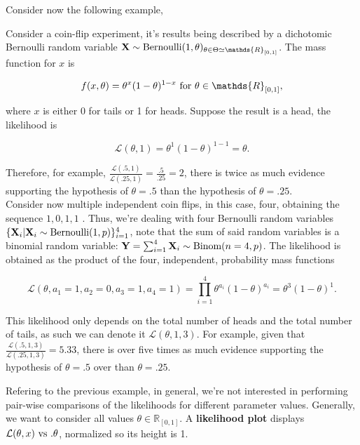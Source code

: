 \documentclass{homework}
\begin{document}
Consider now the following example, 

\begin{tcolorbox}[title = Likelihoods example]

Consider a coin-flip experiment, it's results being described by a dichotomic Bernoulli random variable ${\bf X} \sim \textnormal{Bernoulli}(1,\theta)_{\theta \in \Theta \simeq \mathds{R}_{[0,1]}}$. The mass function for $x$ is 

$$
f(x, \theta) = \theta^x (1- \theta)^{1-x} \textnormal{ for } \theta \in \mathds{R}_{[0,1]},
$$

where $x$ is either 0 for tails or 1 for heads. Suppose the result is a head, the likelihood is 

$$
\mathcal{L}(\theta,1) = \theta^1 (1-\theta)^{1-1} = \theta. 
$$

Therefore, for example, $\frac{\mathcal{L}{(.5,1)}}{\mathcal{L}{(.25,1)}} = \frac{.5}{.25}=2$, there is twice as much evidence supporting the hypothesis of $\theta = .5$ than the hypothesis of $\theta = .25$. \\

Consider now multiple independent coin flips, in this case, four, obtaining the sequence $1, 0, 1, 1$ . Thus, we're dealing with four Bernoulli random variables $\{{\bf X}_i | {\bf X}_i \sim \textnormal{Bernoulli}(1,p)\}_{i=1}^{4} $, note that the sum of said random variables is a binomial random variable: ${\bf Y} = \sum_{i=1}^{4} {\bf X}_i \sim \textnormal{Binom}(n=4,p)$. The likelihood is obtained as the product of the four, independent, probability mass functions

$$
\mathcal{L}(\theta, a_1=1, a_2=0, a_3=1, a_4=1) = \prod_{i=1}^{4} \theta^{a_i}(1-\theta)^{a_i} = \theta^3 (1-\theta)^1.
$$

This likelihood only depends on the total number of heads and the total number of tails, as such we can denote it $\mathcal{L}(\theta, 1,3)$. For example, given that $\frac{\mathcal{L}{(.5,1,3)}}{\mathcal{L}{(.25,1,3)}} = 5.33$, there is over five times as much evidence supporting the hypothesis of $\theta=.5$ over than $\theta =.25$. \\
\end{tcolorbox}

Refering to the previous example, in general, we're not interested in performing pair-wise comparisons of the likelihoods for different parameter values. Generally, we want to consider all values $\theta \in\mathds{R}_{[0,1]}$. A \textbf{likelihood plot} displays $\mathcal{L}(\theta, x) \textnormal{ vs }. \theta$, normalized so its height is 1. \\
\end{document}
